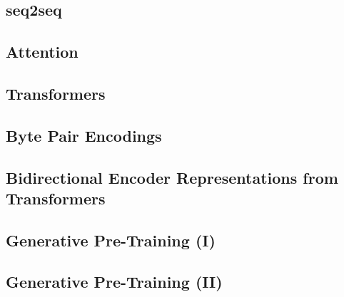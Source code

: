 \subsection{seq2seq}\label{sec:language-models:seq2seq}

\subsection{Attention}\label{sec:language-models:attention}
\subsection{Transformers}\label{sec:language-models:transformers}
\subsection{Byte Pair Encodings}\label{sec:language-models:bpe}
\subsection{Bidirectional Encoder Representations from Transformers}\label{sec:language-models:bert}
\subsection{Generative Pre-Training (I)}\label{sec:language-models:gpt}
\subsection{Generative Pre-Training (II)}\label{sec:language-models:gpt-2}
